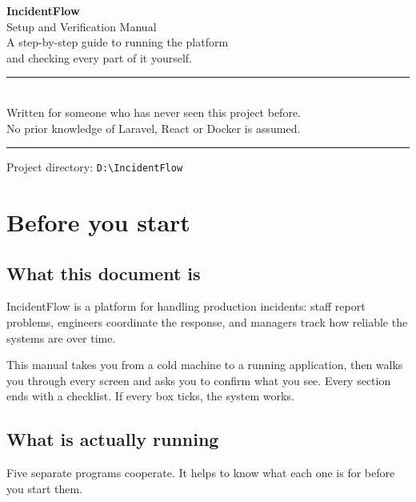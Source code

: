 \documentclass[11pt,a4paper]{article}
\begin{document}
\begin{titlepage}
\centering
\vspace*{3cm}

{\Huge\bfseries IncidentFlow}\\[0.4cm]
{\Large\color{muted} Setup and Verification Manual}\\[2cm]

{\large A step-by-step guide to running the platform\\
and checking every part of it yourself.}\\[1.5cm]

\rule{9cm}{0.4pt}\\[0.6cm]
{\color{muted}\small Written for someone who has never seen this project before.\\
No prior knowledge of Laravel, React or Docker is assumed.}\\[0.6cm]
\rule{9cm}{0.4pt}

\vfill
{\small\color{muted}Project directory: \texttt{D:\textbackslash IncidentFlow}}
\end{titlepage}

\tableofcontents
\newpage

\section{Before you start}

\subsection{What this document is}

IncidentFlow is a platform for handling production incidents: staff report
problems, engineers coordinate the response, and managers track how reliable
the systems are over time.

This manual takes you from a cold machine to a running application, then walks
you through every screen and asks you to confirm what you see. Every section
ends with a checklist. If every box ticks, the system works.

\subsection{What is actually running}

Five separate programs cooperate. It helps to know what each one is for before
you start them.
\end{document}
